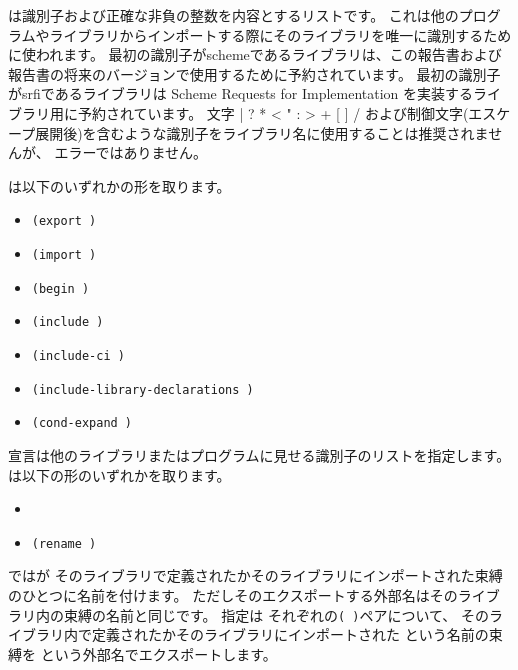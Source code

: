 は識別子および正確な非負の整数を内容とするリストです。
これは他のプログラムやライブラリからインポートする際にそのライブラリを唯一に識別するために使われます。
最初の識別子が{\cf scheme}であるライブラリは、この報告書および報告書の将来のバージョンで使用するために予約されています。
最初の識別子が{\cf srfi}であるライブラリは Scheme Requests for Implementation を実装するライブラリ用に予約されています。
文字 {\cf | \backwhack{} ? * < " : > + [ ] /}
および制御文字(エスケープ展開後)を含むような識別子をライブラリ名に使用することは推奨されませんが、
エラーではありません。

\label{librarydeclarations}
は以下のいずれかの形を取ります。

\begin{itemize}

\item{\tt(export  \dotsfoo)}

\item{\tt(import  \dotsfoo)}

\item{\tt(begin  \dotsfoo)}

\item{\tt(include   \dotsfoo)}

\item{\tt(include-ci   \dotsfoo)}

\item{\tt(include-library-declarations   \dotsfoo)}

\item{\tt(cond-expand   \dotsfoo)}

\end{itemize}

宣言は他のライブラリまたはプログラムに見せる識別子のリストを指定します。
は以下の形のいずれかを取ります。

\begin{itemize}
\item{}
\item{\tt{(rename  )}}
\end{itemize}

ではが
そのライブラリで定義されたかそのライブラリにインポートされた束縛のひとつに名前を付けます。
ただしそのエクスポートする外部名はそのライブラリ内の束縛の名前と同じです。
指定は
それぞれの{\tt( )}ペアについて、
そのライブラリ内で定義されたかそのライブラリにインポートされた
という名前の束縛を
という外部名でエクスポートします。

